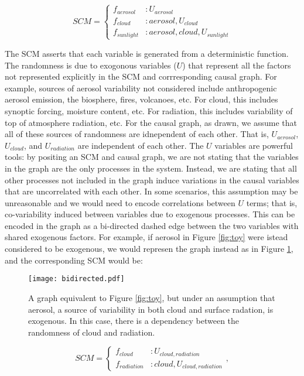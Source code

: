 \documentclass[12pt]{article}
\begin{document}
\begin{equation}
  SCM =
  \begin{cases}
    f_{aerosol} &: U_{aerosol} \\
    f_{cloud} &: aerosol, U_{cloud}  \\
    f_{sunlight} &: aerosol, cloud, U_{sunlight}
  \end{cases}
  \label{eq:1}
\end{equation}

The SCM asserts that each variable is generated from a deterministic
function. The randomness is due to exogonous variables ($U$) that
represent all the factors not represented explicitly in the SCM and
corrresponding causal graph. For example, sources of aerosol
variability not considered include anthropogenic aerosol emission, the
biosphere, fires, volcanoes, etc. For cloud, this includes synoptic
forcing, moisture content, etc. For radiation, this includes
variability of top of atmosphere radiation, etc. For the causal graph,
as drawn, we assume that all of these sources of randomness are
idnependent of each other. That is, $U_{aerosol}$, $U_{cloud}$, and
$U_{radiation}$ are independent of each other. The $U$ variables are
powerful tools: by positing an SCM and causal graph, we are not
stating that the variables in the graph are the only processes in the
system. Instead, we are stating that all other processes not included
in the graph induce variations in the causal variables that are
uncorrelated with each other. In some scenarios, this assumption may
be unreasonable and we would need to encode correlations between $U$
terms; that is, co-variability induced between variables due to
exogenous processes. This can be encoded in the graph as a bi-directed
dashed edge between the two variables with shared exogenous
factors. For example, if aerosol in Figure \ref{fig:toy} were istead
considered to be exogenous, we would represen the graph instead as in
Figure \ref{fig:bi-directed}, and the corresponding SCM would be:

\begin{figure}
  \texttt{[image: bidirected.pdf]}
  \caption{A graph equivalent to Figure \ref{fig:toy}, but under an
    assumption that aerosol, a source of variability in both cloud and
    surface radation, is exogenous. In this case, there is a dependency
    between the randomness of cloud and radiation.}
  \label{fig:bi-directed}
\end{figure}

\begin{equation}
  SCM =
  \begin{cases}
    f_{cloud} &: U_{cloud,radiation}  \\
    f_{radiation} &: cloud, U_{cloud,radiation}
  \end{cases},
  \label{eq:2}
\end{equation}
\end{document}
